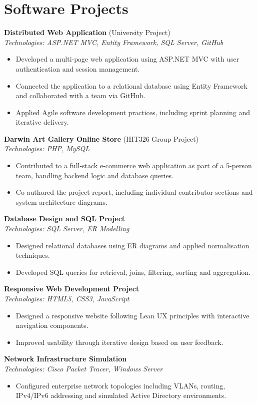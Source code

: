 \documentclass[10.5pt]{article}
\newcommand{\itemlist}[1]{\begin{itemize}[leftmargin=1.4em,itemsep=0pt,topsep=1pt,parsep=0pt]#1\end{itemize}}
\begin{document}
\section{Software Projects}
\textbf{Distributed Web Application} (University Project) \\
\textit{Technologies: ASP.NET MVC, Entity Framework, SQL Server, GitHub}
\itemlist{
\item Developed a multi-page web application using ASP.NET MVC with user authentication and session management.
\item Connected the application to a relational database using Entity Framework and collaborated with a team via GitHub.
\item Applied Agile software development practices, including sprint planning and iterative delivery.
}

\textbf{Darwin Art Gallery Online Store} (HIT326 Group Project) \\
\textit{Technologies: PHP, MySQL}
\itemlist{
\item Contributed to a full-stack e-commerce web application as part of a 5-person team, handling backend logic and database queries.
\item Co-authored the project report, including individual contributor sections and system architecture diagrams.
}

\textbf{Database Design and SQL Project} \\
\textit{Technologies: SQL Server, ER Modelling}
\itemlist{
\item Designed relational databases using ER diagrams and applied normalisation techniques.
\item Developed SQL queries for retrieval, joins, filtering, sorting and aggregation.
}

\textbf{Responsive Web Development Project} \\
\textit{Technologies: HTML5, CSS3, JavaScript}
\itemlist{
\item Designed a responsive website following Lean UX principles with interactive navigation components.
\item Improved usability through iterative design based on user feedback.
}

\textbf{Network Infrastructure Simulation} \\
\textit{Technologies: Cisco Packet Tracer, Windows Server}
\itemlist{
\item Configured enterprise network topologies including VLANs, routing, IPv4/IPv6 addressing and simulated Active Directory environments.
}
\end{document}
